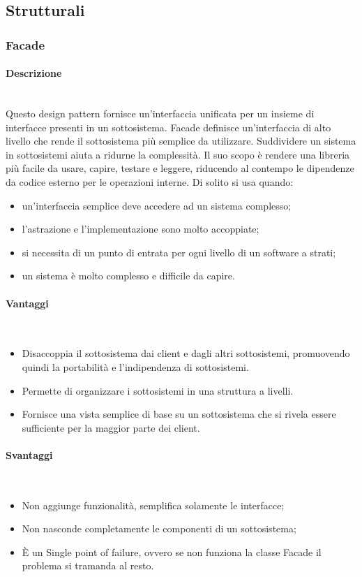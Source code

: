 \subsection{Strutturali}
\subsubsection{Facade}
\paragraph{Descrizione} \mbox{} \\
Questo design pattern fornisce un'interfaccia unificata per un insieme di interfacce presenti in un sottosistema. Facade definisce un'interfaccia di alto livello che rende il sottosistema più semplice da utilizzare. Suddividere un sistema in sottosistemi aiuta a ridurne la complessità. Il suo scopo è rendere una libreria più facile da usare, capire, testare e leggere, riducendo al contempo le dipendenze da codice esterno per le operazioni interne. Di solito si usa quando:
\begin{itemize}
\item un'interfaccia semplice deve accedere ad un sistema complesso;
\item l'astrazione e l'implementazione sono molto accoppiate;
\item si necessita di un punto di entrata per ogni livello di un software a strati;
\item un sistema è molto complesso e difficile da capire.
\end{itemize}
\paragraph{Vantaggi} \mbox{} \\
\begin{itemize}
\item Disaccoppia il sottosistema dai client e dagli altri sottosistemi, promuovendo quindi la portabilità e l'indipendenza di sottosistemi.
\item Permette di organizzare i sottosistemi in una struttura a livelli.
\item Fornisce una vista semplice di base su un sottosistema che si rivela essere sufficiente per la maggior parte dei client.
\end{itemize}
\paragraph{Svantaggi} \mbox{} \\
\begin{itemize}
\item Non aggiunge funzionalità, semplifica solamente le interfacce;
\item Non nasconde completamente le componenti di un sottosistema;
\item È un Single point of failure, ovvero se non funziona la classe Facade il problema si tramanda al resto.
\end{itemize}
